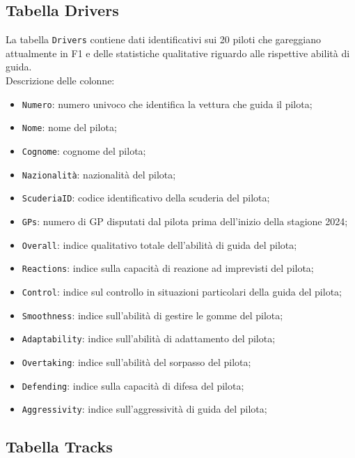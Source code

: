 \subsection{Tabella Drivers}

La tabella \texttt{Drivers} contiene dati identificativi sui 20 piloti che gareggiano attualmente in F1 e delle statistiche qualitative riguardo alle rispettive abilità di guida. \\
Descrizione delle colonne:
\begin{itemize}
    \item \texttt{Numero}: numero univoco che identifica la vettura che guida il pilota;
    \item \texttt{Nome}: nome del pilota;
    \item \texttt{Cognome}: cognome del pilota;
    \item \texttt{Nazionalità}: nazionalità del pilota;
    \item \texttt{ScuderiaID}: codice identificativo della scuderia del pilota;
    \item \texttt{GPs}: numero di GP disputati dal pilota prima dell’inizio della stagione 2024;
    \item \texttt{Overall}: indice qualitativo totale dell’abilità di guida del pilota;
    \item \texttt{Reactions}: indice sulla capacità di reazione ad imprevisti del pilota;
    \item \texttt{Control}: indice sul controllo in situazioni particolari della guida del pilota;
    \item \texttt{Smoothness}: indice sull’abilità di gestire le gomme del pilota;
    \item \texttt{Adaptability}: indice sull’abilità di adattamento del pilota;
    \item \texttt{Overtaking}: indice sull’abilità del sorpasso del pilota;
    \item \texttt{Defending}: indice sulla capacità di difesa del pilota;
    \item \texttt{Aggressivity}: indice sull’aggressività di guida del pilota;
\end{itemize}

\subsection{Tabella Tracks}

